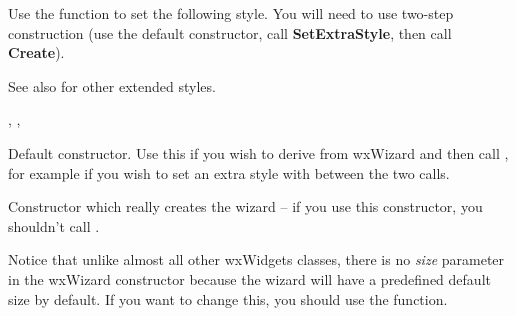 
Use the  function to set the following
style. You will need to use two-step construction (use the default constructor, call {\bf SetExtraStyle}, then call {\bf Create}).

\twocolwidtha{5cm}%
\begin{twocollist}\itemsep=0pt
\end{twocollist}

See also  for other extended styles.


, , 


\label{wxwizardctor}


Default constructor. Use this if you wish to derive from wxWizard and then call 
, for example if you wish to set an extra style
with  between the two
calls.


Constructor which really creates the wizard -- if you use this constructor, you
shouldn't call .

Notice that unlike almost all other wxWidgets classes, there is no {\it size} 
parameter in the wxWizard constructor because the wizard will have a predefined
default size by default. If you want to change this, you should use the 
 function.





